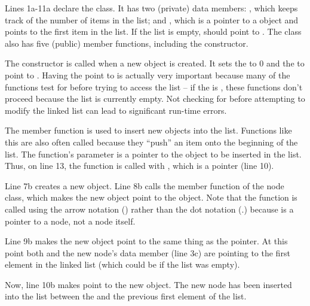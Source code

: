 Lines 1a-11a declare the  class.  It has two (private) data members: , which keeps track of the number of items in the list; and , which is a pointer to a  object and points to the first item in the list.  If the list is empty,  should point to .
The class also has five (public) member functions, including the constructor. 


The constructor is called when a new  object is created.  It sets the  to 0 and the  to point to .  Having the  point to  is actually very important because many of the functions test for  before trying to access the list -- if the  is , these functions don't proceed because the list is currently empty.  Not checking for  before attempting to modify the linked list can lead to significant run-time errors.


The  member function is used to insert new  objects into the list.  Functions like this are also often called   because they ``push'' an item onto the beginning of the list.  The function's parameter is a pointer to the  object to be inserted in the list. Thus, on line 13, the  function is called with , which is a pointer (line 10).

Line 7b creates a new  object.  Line 8b calls the  member function of the node class, which makes the new  object point to the  object.  Note that the  function is called using the arrow notation (\codefont{-$>$}) rather than the dot notation (.) because  is a pointer to a node, not a node itself.

Line 9b makes the new  object point to the same thing as the  pointer.  At this point both  and the new node's  data member (line 3c) are pointing to the first element in the linked list (which could be  if the list was empty). 

Now, line 10b makes  point to the new  object.  The new node has been inserted into the list between the  and the previous first element of the list.  

